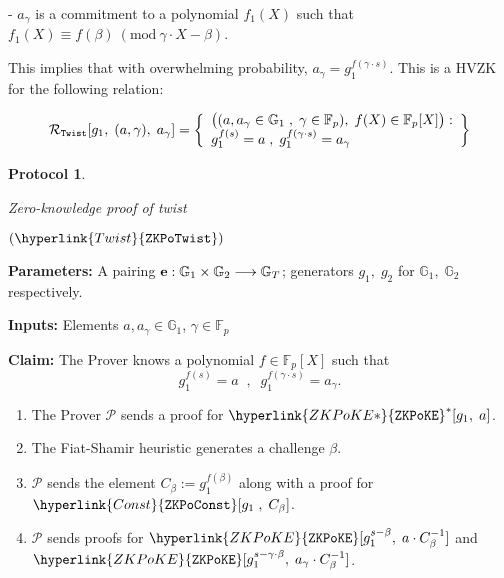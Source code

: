 \documentclass[11pt, lettersize, notitlepage, leqno, footskip=0.6cm]{article}
\newcommand{\bFp}{\mathbb{F}_p}
\newcommand{\lra}{\longrightarrow}
\newcommand{\mc}{\mathcal}
\newcommand{\mb}{\mathbb}
\newcommand{\be}{\beta}
\newcommand{\mP}{\mc{P}}
\newcommand{\vs}{\vspace{-0.15cm}}
\newcommand{\noin}{\noindent}
\newcommand{\op}{overwhelming probability}
\newcommand{\Mod}[1]{\ (\mathrm{mod}\ #1)}
\newtheorem{Prot}[Thm]{Protocol}
\numberwithin{equation}{section}
\begin{document}
\noin - $a_{\gamma}$ is a commitment to a polynomial $f_1(X)$ such that $f_1(X)\equiv f(\be)\Mod{\gamma\cdot X-\be}$. \vspace{2mm}

This implies that with \op, $a_{\gamma} = g_1^{f(\gamma\cdot s)}$. This is a HVZK for the following relation:

\vs $$\mc{R}_{\tt{Twist}}[g_1,\;(a,\gamma),\;a_{\gamma}] = \left\{\begin{array}{l} 
\big((a,a_{\gamma}\in\mb{G}_1\;,\; \gamma\in\bFp ),\; f(X)\in \bFp[X]\big):\\
g_1^{f(s)} = a\;,\; g_1^{f(\gamma\cdot s)} = a_{\gamma}\end{array}\right\}  $$



\begin{mdframed}
\begin{Prot} \hypertarget{Twist}{Zero-knowledge proof of twist} $(\hyperlink{Twist}{\tt{ZKPoTwist}})$\end{Prot}  

\noin \textbf{Parameters:} A pairing ${\bf{e}}:\mb{G}_1\times \mb{G}_2\lra \mb{G}_T$; generators $g_1,\;g_2$ for $\mb{G}_1,\; \mb{G}_2$ respectively.


\noindent \textbf{Inputs:} Elements $a, a_{\gamma} \in \mb{G}_1$, $\gamma\in \bFp$

\noin \textbf{Claim:} The Prover knows a polynomial $f\in \bFp[X]$ such that \vs $$g_1^{f(s)} = a\;\;,\;\; g_1^{f(\gamma\cdot s)} = a_{\gamma} .$$

\begin{enumerate}[wide, labelwidth=!, labelindent=0pt, itemsep=-0.2ex]

\item The Prover $\mP$ sends a proof for $\hyperlink{ZKPoKE*}{\tt{ZKPoKE}}^*[g_1,\;a]$.

\item The Fiat-Shamir heuristic generates a challenge $\be$.

\item $\mP$ sends the element $C_{\be}:= g_1^{f(\be)}$ along with a proof for $\hyperlink{Const}{\tt{ZKPoConst}}[g_1\;,\;C_{\be}]$.

\item $\mP$ sends proofs for $\hyperlink{ZKPoKE}{\tt{ZKPoKE}}[g_1^{s-\be},\;a\cdot C_{\be}^{-1}]$ and $\hyperlink{ZKPoKE}{\tt{ZKPoKE}}[g_1^{s-\gamma\cdot\be},\;a_{\gamma}\cdot C_{\be}^{-1}]$.



\end{enumerate}
\end{mdframed}
\end{document}

